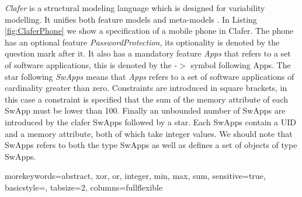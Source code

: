 \documentclass{article}
\begin{document}
\emph{Clafer} is a structural modeling language which is designed for variability modelling. It unifies both feature models  and meta-models \cite{BakClaferSLE2010}.
%
In Listing \ref{fig:ClaferPhone}  we show a specification of a mobile phone in Clafer. 
%
The phone has an optional feature \emph{PasswordProtection}, its optionality is denoted by the question mark after it. It also has a mandatory feature \emph{Apps} that refers  to a set of software applications, this is denoted by the  -$>$ symbol following  Apps. 
%
The star following  \emph{SwApps} means that \emph{Apps} refers to a set of software applications of cardinality greater than zero. 
%
Constraints are introduced in  square brackets, in this case a constraint is specified that the sum of the memory attribute of each SwApp must be lower than 100. 
%
Finally an unbounded number of SwApps are introduced by the clafer SwApps followed by a star. Each SwApps contain a UID and a memory attribute, both of which take integer values.  
%
We should note that SwApps refers to both the type SwApps as well as defines a set of objects of type SwApps.

{morekeywords={abstract, xor, or, integer, min, max, sum},
sensitive=true,
basicstyle={\sffamily\small},
tabsize=2,
columns=fullflexible
}

%
%	
\end{document}
